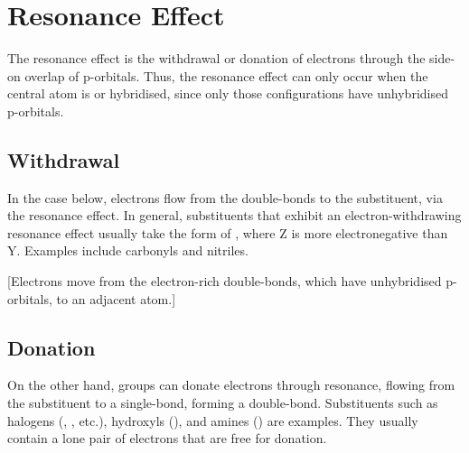 	\section{Resonance Effect}

		The resonance effect is the withdrawal or donation of electrons through the side-on overlap of  p-orbitals.
		Thus, the resonance effect can only occur when the central atom is \spone or \sptwo hybridised, since only those
		configurations have unhybridised p-orbitals.


		\subsection{Withdrawal}

			In the case below, electrons flow from the double-bonds to the substituent, via the resonance effect. In general, substituents
			that exhibit an electron-withdrawing resonance effect usually take the form of , where Z is more electronegative than Y.
			Examples include carbonyls and nitriles.

			[Electrons move from the electron-rich double-bonds, which have unhybridised p-orbitals, to an adjacent atom.]



		\pagebreak
		\subsection{Donation}

			On the other hand, groups can donate electrons through resonance, flowing from the substituent to a single-bond, forming
			a double-bond. Substituents such as halogens (, \ch{\Cl}, etc.), hydroxyls (), and amines ()
			are examples. They usually contain a lone pair of electrons that are free for donation.


